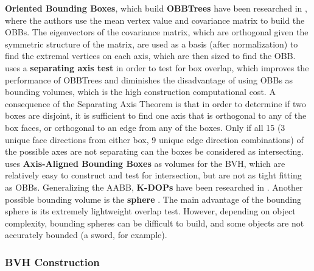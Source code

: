 
\FloatBarrier

\textbf{Oriented Bounding Boxes}, which build \textbf{OBBTrees} have been researched in \citep{gott96}, where the authors use the mean vertex value and covariance matrix to build the OBBs. The eigenvectors of the covariance matrix, which are orthogonal given the symmetric structure of the matrix, are used as a basis (after normalization) to find the extremal vertices on each axis, which are then sized to find the OBB.
\citep{gott96} uses a \textbf{separating axis test} in order to test for box overlap, which improves the performance of OBBTrees and diminishes the disadvantage of using OBBs as bounding volumes, which is the high construction computational cost. A consequence of the Separating Axis Theorem is that in order to determine if two boxes are disjoint, it is sufficient to find one axis that is orthogonal to any of the box faces, or orthogonal to an edge from any of the boxes. Only if all 15 (3 unique face directions from either box, 9 unique edge direction combinations) of the possible axes are not separating can the boxes be considered as intersecting. \citep{vdb97} uses \textbf{Axis-Aligned Bounding Boxes} as volumes for the BVH, which are relatively easy to construct and test for intersection, but are not as tight fitting as OBBs. Generalizing the AABB, \textbf{K-DOPs} have been researched in \citep{klo98}. Another possible bounding volume is the \textbf{sphere} \citep{hub96, rtsd01}. The main advantage of the bounding sphere is its extremely lightweight overlap test. However, depending on object complexity, bounding spheres can be difficult to build, and some objects are not accurately bounded (a sword, for example).

\subsubsection{BVH Construction}
\label{sub-sub-sec:bvhconstruction}

